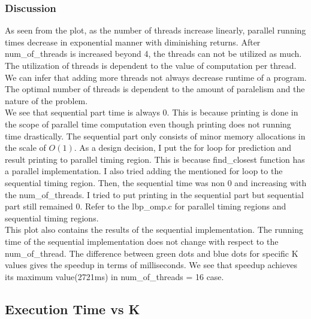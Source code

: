 \documentclass{article}
\begin{document}
\subsubsection{Discussion}
\qquad As seen from the plot, as the number of threads increase linearly, parallel running times decrease in exponential manner with diminishing returns. After num\_of\_threads is increased beyond 4, the threads can not be utilized as much. The utilization of threads is dependent to the value of computation per thread. We can infer that adding more threads not always decrease runtime of a program. The optimal number of threads is dependent to the amount of paralelism and the nature of the problem.\\
\null \qquad We see that sequential part time is always 0. This is because printing is done in the scope of parallel time computation even though printing does not running time drastically. The sequential part only consists of minor memory allocations in the scale of $O(1)$. As a design decision, I put the for loop for prediction and result printing to parallel timing region. This is because find\_closest function has a parallel implementation. I also tried adding the mentioned for loop to the sequential timing region. Then, the sequential time was non 0 and increasing with the num\_of\_threads. I tried to put printing in the sequential part but sequential part still remained 0. Refer to the lbp\_omp.c for parallel timing regions and sequential timing regions.\\
\null \qquad This plot also contains the results of the sequential implementation. The running time of the sequential implementation does not change with respect to the num\_of\_thread. The difference between green dots and blue dots for specific K values gives the speedup in terms of milliseconds. We see that speedup achieves its maximum value(2721ms) in num\_of\_threads = 16 case. 

\subsection{Execution Time vs K}
\end{document}
